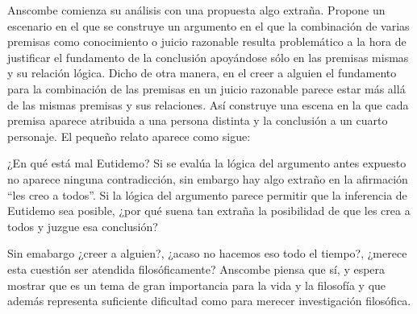 Anscombe comienza su análisis con una propuesta algo extraña. Propone un escenario en el que se construye un argumento en el que la combinación de varias premisas como conocimiento o juicio razonable resulta problemático a la hora de justificar el fundamento de la conclusión apoyándose sólo en las premisas mismas y su relación lógica. Dicho de otra manera, en el creer a alguien el fundamento para la combinación de las premisas en un juicio razonable parece estar más allá de las mismas premisas y sus relaciones. Así construye una escena en la que cada premisa aparece atribuida a una persona distinta y la conclusión a un cuarto personaje. El pequeño relato aparece como sigue: 

¿En qué está mal Eutidemo? Si se evalúa la lógica del argumento antes expuesto
no aparece ninguna contradicción, sin embargo hay algo extraño en la afirmación
``les creo a todos''. Si la lógica del argumento parece permitir que la
inferencia de Eutidemo sea posible, ¿por qué suena tan extraña la posibilidad de
que les crea a todos y juzgue esa conclusión?

Sin emabargo ¿creer a alguien?, ¿acaso no hacemos eso todo el tiempo?, ¿merece esta cuestión ser atendida filosóficamente? Anscombe piensa que sí, y espera mostrar que es un tema de gran importancia para la vida y la filosofía y que además representa suficiente dificultad como para merecer investigación filosófica.

